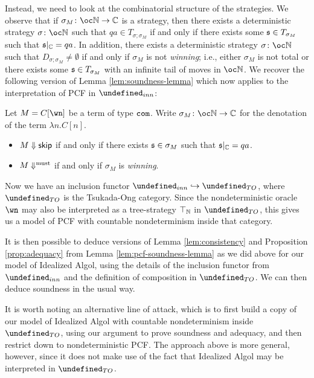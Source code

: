 \documentclass[sigplan,10pt,review]{acmart}\settopmatter{printfolios=true,printccs=false,printacmref=false}
\let\G\undefined
\begin{document}
Instead, we need to look at the combinatorial structure of the strategies.  
We observe that if $\sigma_M\from\oc\bN\to\bC$ is a strategy, then there exists a deterministic strategy $\sigma\from\oc\bN$ such that $qa\in T_{\sigma;\sigma_M}$ if and only if there exists some $\mathfrak s\in T_{\sigma_M}$ such that $\mathfrak s\vert_{\mathbb{C}}=qa$.  
In addition, there exists a deterministic strategy $\sigma\from\oc\bN$ such that $D_{\sigma;\sigma_M}\ne\emptyset$ if and only if $\sigma_M$ is not \emph{winning}; i.e., either $\sigma_M$ is not total or there exists some $\mathfrak s\in T_{\sigma_M}$ with an infinite tail of moves in $\oc\bN$.  
We recover the following version of Lemma \ref{lem:soundness-lemma} which now applies to the interpretation of PCF in $\G_{inn}$:
\begin{lemma}
  Let $M=C[\wn]$ be a term of type ${\mathtt{com}}$.  
  Write $\sigma_M\from\oc\bN\to\bC$ for the denotation of the term $\lambda n.C[n]$.  
  \begin{itemize}
    \item $M\Downarrow{\mathsf{skip}}$ if and only if there exists $\mathfrak s\in \sigma_M$ such that $\mathfrak s\vert_{\mathbb{C}}=qa$.  
    \item $M\Downarrow^{\text{must}}$ if and only if $\sigma_M$ is \emph{winning}.
  \end{itemize}
  \label{lem:pcf-soundness-lemma}
\end{lemma}

Now we have an inclusion functor $\G_{inn}\hookrightarrow\G_{TO}$, where $\G_{TO}$ is the Tsukada-Ong category.  
Since the nondeterministic oracle $\wn$ may also be interpreted as a tree-strategy $\top_{\mathbb{N}}$ in $\G_{TO}$, this gives us a model of PCF with countable nondeterminism inside that category.  

It is then possible to deduce versions of Lemma \ref{lem:consistency} and Proposition \ref{prop:adequacy} from Lemma \ref{lem:pcf-soundness-lemma} as we did above for our model of Idealized Algol, using the details of the inclusion functor from $\G_{inn}$ and the definition of composition in $\G_{TO}$.  
We can then deduce soundness in the usual way.

It is worth noting an alternative line of attack, which is to first build a copy of our model of Idealized Algol with countable nondeterminism inside $\G_{TO}$, using our argument to prove soundness and adequacy, and then restrict down to nondeterministic PCF.
The approach above is more general, however, since it does not make use of the fact that Idealized Algol may be interpreted in $\G_{TO}$.
\end{document}
